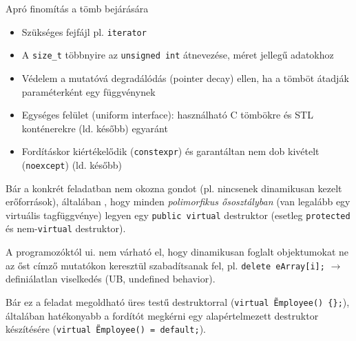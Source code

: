\begin{frame}
    Apró finomítás a tömb bejárására
    \begin{exampleblock}{}
        \vspace{-.2cm}
        \small
        
        \vspace{-.2cm}
    \end{exampleblock}
    \begin{exampleblock}{}
        \vspace{-.2cm}
        \small
        
        \vspace{-.2cm}
    \end{exampleblock}
    \begin{itemize}
        \footnotesize
        \item Szükséges fejfájl pl. \texttt{iterator}
        \item A \texttt{size\_t} többnyire az \texttt{unsigned int} átnevezése, méret jellegű adatokhoz
        \item Védelem a mutatóvá degradálódás (pointer decay) ellen, ha a tömböt átadják paraméterként egy függvénynek
        \item Egységes felület (uniform interface): használható C tömbökre és STL konténerekre (ld. később) egyaránt
        \item Fordításkor kiértékelődik (\texttt{constexpr}) és garantáltan nem dob kivételt (\texttt{noexcept}) (ld. később)
    \end{itemize}
\end{frame}

\begin{frame}
    Bár a konkrét feladatban nem okozna gondot (pl. nincsenek dinamikusan kezelt erőforrások), általában , hogy minden \emph{polimorfikus ősosztályban} (van legalább egy virtuális tagfüggvénye) legyen egy \texttt{public virtual} destruktor (esetleg \texttt{protected} és nem-\texttt{virtual} destruktor).

    A programozóktól ui. nem várható el, hogy dinamikusan foglalt objektumokat ne az őst címző mutatókon keresztül szabadítsanak fel, pl. \texttt{delete eArray[i];} $\to$ definiálatlan viselkedés (UB, undefined behavior).

    Bár ez a feladat megoldható üres testű destruktorral (\texttt{virtual \~Employee() \{\};}), általában hatékonyabb a fordítót megkérni egy alapértelmezett destruktor készítésére (\texttt{virtual \~Employee() = default;}).
\end{frame}

